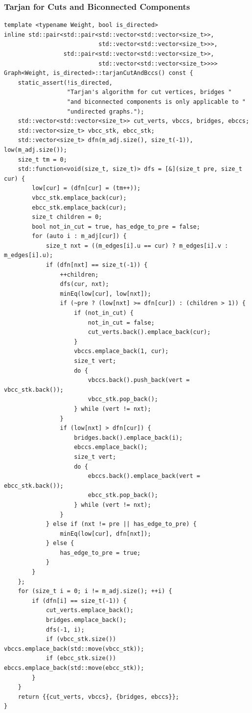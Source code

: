 \documentclass[UTF8]{article}
\begin{document}
\subsubsection{Tarjan for Cuts and Biconnected Components}
\begin{verbatim}
template <typename Weight, bool is_directed>
inline std::pair<std::pair<std::vector<std::vector<size_t>>,
						   std::vector<std::vector<size_t>>>,
				 std::pair<std::vector<std::vector<size_t>>,
						   std::vector<std::vector<size_t>>>>
Graph<Weight, is_directed>::tarjanCutAndBccs() const {
	static_assert(!is_directed,
				  "Tarjan's algorithm for cut vertices, bridges "
				  "and biconnected components is only applicable to "
				  "undirected graphs.");
	std::vector<std::vector<size_t>> cut_verts, vbccs, bridges, ebccs;
	std::vector<size_t> vbcc_stk, ebcc_stk;
	std::vector<size_t> dfn(m_adj.size(), size_t(-1)), low(m_adj.size());
	size_t tm = 0;
	std::function<void(size_t, size_t)> dfs = [&](size_t pre, size_t cur) {
		low[cur] = (dfn[cur] = (tm++));
		vbcc_stk.emplace_back(cur);
		ebcc_stk.emplace_back(cur);
		size_t children = 0;
		bool not_in_cut = true, has_edge_to_pre = false;
		for (auto i : m_adj[cur]) {
			size_t nxt = ((m_edges[i].u == cur) ? m_edges[i].v : m_edges[i].u);
			if (dfn[nxt] == size_t(-1)) {
				++children;
				dfs(cur, nxt);
				minEq(low[cur], low[nxt]);
				if (~pre ? (low[nxt] >= dfn[cur]) : (children > 1)) {
					if (not_in_cut) {
						not_in_cut = false;
						cut_verts.back().emplace_back(cur);
					}
					vbccs.emplace_back(1, cur);
					size_t vert;
					do {
						vbccs.back().push_back(vert = vbcc_stk.back());
						vbcc_stk.pop_back();
					} while (vert != nxt);
				}
				if (low[nxt] > dfn[cur]) {
					bridges.back().emplace_back(i);
					ebccs.emplace_back();
					size_t vert;
					do {
						ebccs.back().emplace_back(vert = ebcc_stk.back());
						ebcc_stk.pop_back();
					} while (vert != nxt);
				}
			} else if (nxt != pre || has_edge_to_pre) {
				minEq(low[cur], dfn[nxt]);
			} else {
				has_edge_to_pre = true;
			}
		}
	};
	for (size_t i = 0; i != m_adj.size(); ++i) {
		if (dfn[i] == size_t(-1)) {
			cut_verts.emplace_back();
			bridges.emplace_back();
			dfs(-1, i);
			if (vbcc_stk.size()) vbccs.emplace_back(std::move(vbcc_stk));
			if (ebcc_stk.size()) ebccs.emplace_back(std::move(ebcc_stk));
		}
	}
	return {{cut_verts, vbccs}, {bridges, ebccs}};
}
\end{verbatim}
\end{document}
